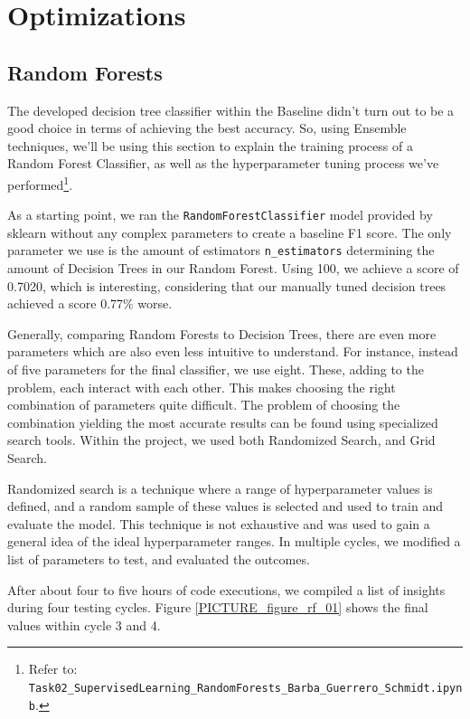 \section{Optimizations}
\label{SECTION_Optimizations}

\subsection{Random Forests}
\label{SUBSECTION_RandomForests}

The developed decision tree classifier within the Baseline didn’t turn out to be a good choice in terms of achieving the best accuracy. So, using Ensemble techniques, we’ll be using this section to explain the training process of a Random Forest Classifier, as well as the hyperparameter tuning process we’ve performed\footnote{Refer to: \texttt{Task02\_SupervisedLearning\_RandomForests\_Barba\_Guerrero\_Schmidt.ipynb}.}.

As a starting point, we ran the \texttt{RandomForestClassifier} model provided by sklearn without any complex parameters to create a baseline F1 score. The only parameter we use is the amount of estimators \texttt{n\_estimators} determining the amount of Decision Trees in our Random Forest. Using 100, we achieve a score of 0.7020, which is interesting, considering that our manually tuned decision trees achieved a score 0.77\% worse.

Generally, comparing Random Forests to Decision Trees, there are even more parameters which are also even less intuitive to understand. For instance, instead of five parameters for the final classifier, we use eight. These, adding to the problem, each interact with each other. This makes choosing the right combination of parameters quite difficult. The problem of choosing the combination yielding the most accurate results can be found using specialized search tools. Within the project, we used both Randomized Search, and Grid Search.

Randomized search is a technique where a range of hyperparameter values is defined, and a random sample of these values is selected and used to train and evaluate the model. This technique is not exhaustive and was used to gain a general idea of the ideal hyperparameter ranges. In multiple cycles, we modified a list of parameters to test, and evaluated the outcomes. 

After about four to five hours of code executions, we compiled a list of insights during four testing cycles. Figure \ref{PICTURE_figure_rf_01} shows the final values within cycle 3 and 4.

